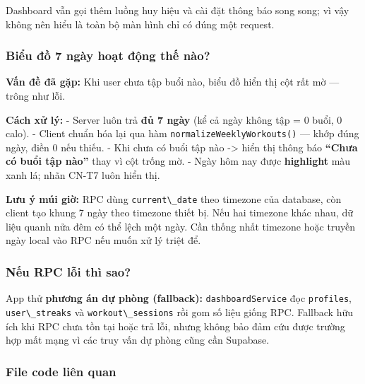 \documentclass[12pt,a4paper]{article}
\providecommand{\passthrough}[1]{#1}
\begin{document}
Dashboard vẫn gọi thêm luồng huy hiệu và cài đặt thông báo song song; vì
vậy không nên hiểu là toàn bộ màn hình chỉ có đúng một request.

\subsubsection{Biểu đồ 7 ngày hoạt động thế
nào?}\label{biux1ec3u-ux111ux1ed3-7-nguxe0y-houx1ea1t-ux111ux1ed9ng-thux1ebf-nuxe0o}

\textbf{Vấn đề đã gặp:} Khi user chưa tập buổi nào, biểu đồ hiển thị cột
rất mờ --- trông như lỗi.

\textbf{Cách xử lý:} - Server luôn trả \textbf{đủ 7 ngày} (kể cả ngày
không tập = 0 buổi, 0 calo). - Client chuẩn hóa lại qua hàm
\passthrough{\lstinline!normalizeWeeklyWorkouts()!} --- khớp đúng ngày,
điền 0 nếu thiếu. - Khi chưa có buổi tập nào -\textgreater{} hiển thị
thông báo \textbf{``Chưa có buổi tập nào''} thay vì cột trống mờ. - Ngày
hôm nay được \textbf{highlight} màu xanh lá; nhãn CN-T7 luôn hiển thị.

\textbf{Lưu ý múi giờ:} RPC dùng \passthrough{\lstinline!current\_date!}
theo timezone của database, còn client tạo khung 7 ngày theo timezone
thiết bị. Nếu hai timezone khác nhau, dữ liệu quanh nửa đêm có thể lệch
một ngày. Cần thống nhất timezone hoặc truyền ngày local vào RPC nếu
muốn xử lý triệt để.

\subsubsection{Nếu RPC lỗi thì
sao?}\label{nux1ebfu-rpc-lux1ed7i-thuxec-sao}

App thử \textbf{phương án dự phòng (fallback):}
\passthrough{\lstinline!dashboardService!} đọc
\passthrough{\lstinline!profiles!},
\passthrough{\lstinline!user\_streaks!} và
\passthrough{\lstinline!workout\_sessions!} rồi gom số liệu giống RPC.
Fallback hữu ích khi RPC chưa tồn tại hoặc trả lỗi, nhưng không bảo đảm
cứu được trường hợp mất mạng vì các truy vấn dự phòng cũng cần Supabase.

\subsubsection{File code liên quan}\label{file-code-liuxean-quan}
\end{document}
